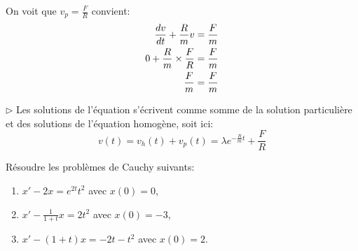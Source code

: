 {\begin{nntd-sol}[]
\begin{itemize}
				On voit que \(v_p=\frac FR\) convient:
				\begin{equation*}
					\begin{aligned}
						\frac{\mathop{}\!{d} v}{\mathop{}\!{d} t}+\frac Rmv&=\frac Fm\\
						0+\frac Rm\times \frac FR &= \frac Fm\\
						\frac Fm &= \frac Fm
					\end{aligned}
				\end{equation*}
			\end{itemize}

			\(\triangleright\) Les solutions de l'équation s'écrivent comme somme de la 
			solution particulière et des solutions de l'équation homogène, soit ici:
			\begin{equation*}
				v(t)= v_h(t) + v_p(t) = \lambda e^{-{\frac Rm t}} + \frac FR
			\end{equation*}
		\end{nntd-sol}
}{}

\begin{td-exo}[] %
	Résoudre les problèmes de Cauchy suivants:
	\begin{enumerate}
		\item \(x'-2x=e^{2t}t^2\) avec \(x(0)=0\),
		\item \(x' -\frac1{1+t}x=2t^2\) avec \(x(0)=-3\),
		\item \(x'-(1+t)x=-2t-t^2\) avec \(x(0)=2\).
	\end{enumerate}

\end{td-exo}

